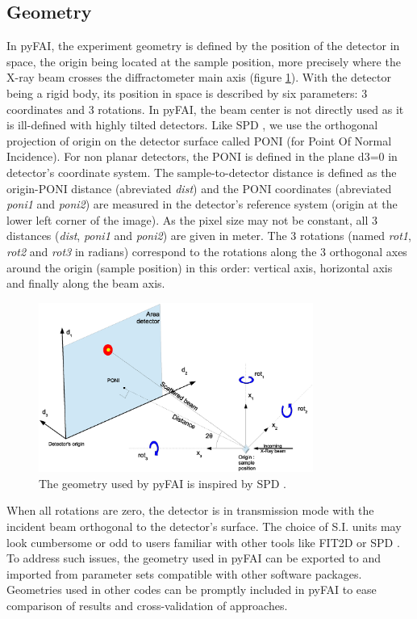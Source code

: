 \documentclass{iucr}
\begin{document}
\subsection{Geometry}
In pyFAI, the experiment geometry is defined by the position of the detector in
space, the origin being located at the sample position, more precisely where the
X-ray beam crosses the diffractometer main axis (figure \ref{PONI}).
With the detector being a rigid body, its position in space is described by
six parameters: 3 coordinates and 3 rotations.
In pyFAI, the beam center is not directly used as it is ill-defined with
highly tilted detectors.
Like SPD \cite{spd}, we use the orthogonal projection of origin on
the detector surface called PONI (for Point Of Normal Incidence).
For non planar detectors, the PONI is defined in the plane d3=0 in detector's
coordinate system.
The sample-to-detector distance is defined as the origin-PONI distance
(abreviated \textit{dist}) and the PONI coordinates (abreviated
\textit{poni1} and \textit{poni2}) are measured in the detector's reference
system (origin at the lower left corner of the image).
As the pixel size may not be constant, all 3 distances (\textit{dist},
\textit{poni1} and \textit{poni2}) are given in meter.
The 3 rotations (named \textit{rot1}, \textit{rot2} and \textit{rot3} in
radians)
correspond to the rotations along the 3 orthogonal axes around the origin
(sample position) in this order:
vertical axis, horizontal axis and finally along the beam axis.

\begin{figure}
\label{PONI}
\begin{center}
\includegraphics[width=9cm]{PONI.eps}
\caption{The geometry used by pyFAI is inspired by SPD \cite{spd}.}
\end{center}
\end{figure}

When all rotations are zero, the detector is in transmission mode with the
incident beam orthogonal to the detector's surface.
The choice of S.I. units may look cumbersome or odd to users familiar
with other tools like FIT2D \cite{fit2d} or SPD \cite{spd}.
To address such issues, the geometry used in pyFAI can be
exported to and imported from parameter sets compatible with other software
packages.
Geometries used in other codes can be promptly included in pyFAI to ease
comparison of results and cross-validation of approaches.
\end{document}
